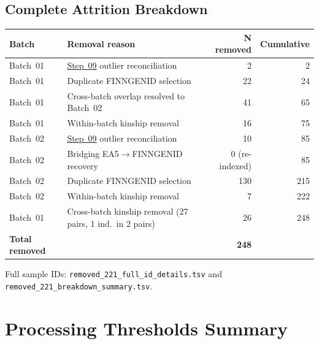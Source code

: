 \documentclass[11pt,a4paper]{article}
\begin{document}
\subsection{Complete Attrition Breakdown}

{\footnotesize
\renewcommand{\arraystretch}{1.2}
\begin{longtable}{p{2cm}p{6.5cm}r r}
\toprule
\textbf{Batch} & \textbf{Removal reason}
  & \textbf{N removed} & \textbf{Cumulative} \\
\midrule
Batch~01 & \href{https://github.com/FINNGEN/FinnGen3-proteomics-pipeline#pipeline-steps}{Step~09} outlier reconciliation & 2 & 2 \\
Batch~01 & Duplicate FINNGENID selection & 22 & 24 \\
Batch~01 & Cross-batch overlap resolved to Batch~02 & 41 & 65 \\
Batch~01 & Within-batch kinship removal & 16 & 75 \\
Batch~02 & \href{https://github.com/FINNGEN/FinnGen3-proteomics-pipeline#pipeline-steps}{Step~09} outlier reconciliation & 10 & 85 \\
Batch~02 & Bridging EA5$\to$FINNGENID recovery & 0 (re-indexed) & 85 \\
Batch~02 & Duplicate FINNGENID selection & 130 & 215 \\
Batch~02 & Within-batch kinship removal & 7 & 222 \\
\midrule
Batch~01 & Cross-batch kinship removal (27 pairs, 1 ind.\ in 2 pairs) & 26 & 248 \\
\textbf{Total removed} & & \textbf{248} & \\
\bottomrule
\end{longtable}
\renewcommand{\arraystretch}{1.0}
}

Full sample IDs: \texttt{removed\_221\_full\_id\_details.tsv} and
\texttt{removed\_221\_breakdown\_summary.tsv}.

\section{Processing Thresholds Summary}
\label{sec:thresholds}
\end{document}

